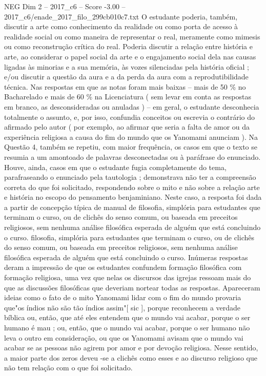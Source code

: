 \begin{textsample}{NEG Dim 2 – 2017\_c6 – Score -3.00 – 2017\_c6/enade\_2017\_filo\_299cb010c7.txt}
O estudante poderia, também, discutir a arte como conhecimento da realidade ou como porta de acesso à realidade social ou como maneira de representar o real, meramente como mimesis ou como reconstrução crítica do real.
Poderia discutir a relação entre história e arte, ao considerar o papel social da arte e o engajamento social dela nas causas ligadas às minorias e a sua memória, às vozes silenciadas pela história oficial ; e/ou discutir a questão da aura e a da perda da aura com a reprodutibilidade técnica.
Nas respostas em que as notas foram mais baixas – mais de 50 \% no Bacharelado e mais de 60 \% na Licenciatura ( sem levar em conta as respostas em branco, as desconsideradas ou anuladas ) – em geral, o estudante desconhecia totalmente o assunto, e, por isso, confundia conceitos ou escrevia o contrário do afirmado pelo autor ( por exemplo, ao afirmar que seria a falta de amor ou da experiência religiosa a causa do fim do mundo que os Yanomami anunciam ).
Na Questão 4, também se repetiu, com maior frequência, os casos em que o texto se resumia a um amontoado de palavras desconectadas ou à paráfrase do enunciado.
Houve, ainda, casos em que o estudante fugia completamente do tema, parafraseando o enunciado pela tautologia ; demonstrava não ter a compreensão correta do que foi solicitado, respondendo sobre o mito e não sobre a relação arte e história no escopo do pensamento benjaminiano.
Neste caso, a resposta foi dada a partir de concepção típica de manual de filosofia, simplória para estudantes que terminam o curso, ou de clichês do senso comum, ou baseada em preceitos religiosos, sem nenhuma análise filosófica esperada de alguém que está concluindo o curso. filosofia, simplória para estudantes que terminam o curso, ou de clichês do senso comum, ou baseada em preceitos religiosos, sem nenhuma análise filosófica esperada de alguém que está concluindo o curso.
Inúmeras respostas deram a impressão de que os estudantes confundem formação filosófica com formação religiosa, uma vez que nelas os discursos das igrejas ressoam mais do que as discussões filosóficas que deveriam nortear todas as respostas.
Apareceram ideias como o fato de o mito Yanomami lidar com o fim do mundo provaria que"os índios não são tão índios assim"[ sic ], porque reconhecem a verdade bíblica ou, então, que até eles entendem que o mundo vai acabar, porque o ser humano é mau ; ou, então, que o mundo vai acabar, porque o ser humano não leva o outro em consideração, ou que os Yanomami avisam que o mundo vai acabar se as pessoas não agirem por amor e por devoção religiosa.
Nesse sentido, a maior parte dos zeros deveu -se a clichês como esses e ao discurso religioso que não tem relação com o que foi solicitado.

\end{textsample}
